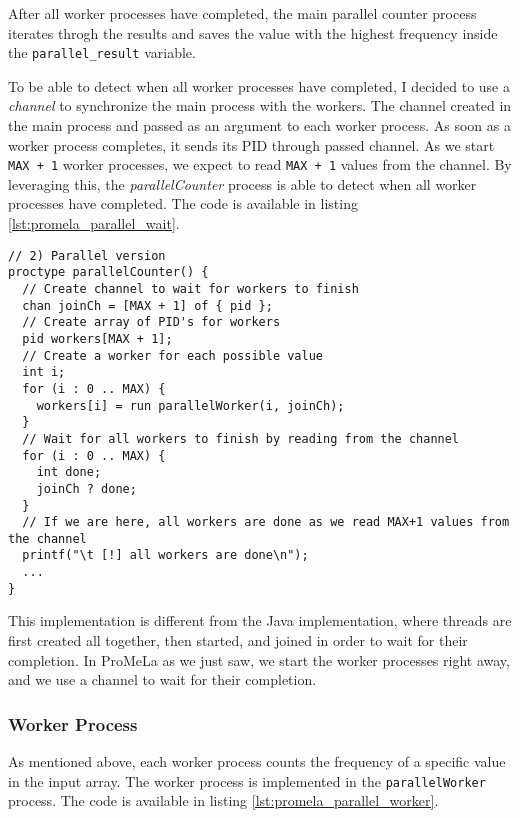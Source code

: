 \documentclass[a4paper, 11pt]{article}
\begin{document}
After all worker processes have completed, the main parallel counter process iterates throgh the results and saves the value with the highest frequency inside the \texttt{parallel\_result} variable.

To be able to detect when all worker processes have completed, I decided to use a \textit{channel} to synchronize the main process with the workers. The channel created in the main process and passed as an argument to each worker process. As soon as a worker process completes, it sends its PID through passed channel. As we start \texttt{MAX + 1} worker processes, we expect to read \texttt{MAX + 1} values from the channel. By leveraging this, the \textit{parallelCounter} process is able to detect when all worker processes have completed. The code is available in listing \ref{lst:promela_parallel_wait}.

\begin{lstlisting}[language=Promela, caption={ProMeLa parallel frequency counter - worker synchronization with channel}, captionpos=b, breaklines=true, label={lst:promela_parallel_wait}]
// 2) Parallel version
proctype parallelCounter() {
  // Create channel to wait for workers to finish
  chan joinCh = [MAX + 1] of { pid };
  // Create array of PID's for workers
  pid workers[MAX + 1];
  // Create a worker for each possible value
  int i;
  for (i : 0 .. MAX) {
    workers[i] = run parallelWorker(i, joinCh);
  }
  // Wait for all workers to finish by reading from the channel
  for (i : 0 .. MAX) {
    int done;
    joinCh ? done;
  }
  // If we are here, all workers are done as we read MAX+1 values from the channel
  printf("\t [!] all workers are done\n");
  ...
}
\end{lstlisting}

This implementation is different from the Java implementation, where threads are first created all together, then started, and joined in order to wait for their completion. In ProMeLa as we just saw, we start the worker processes right away, and we use a channel to wait for their completion.

\subsubsection{Worker Process}

As mentioned above, each worker process counts the frequency of a specific value in the input array. The worker process is implemented in the \texttt{parallelWorker} process. The code is available in listing \ref{lst:promela_parallel_worker}.
\end{document}
